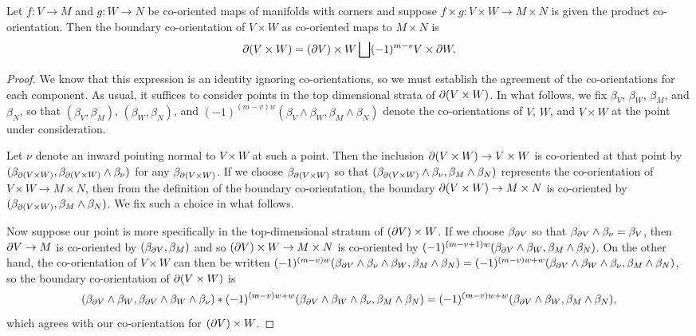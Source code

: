 \begin{proposition}\label{P: boundary of exterior product}
	Let $f \colon V \to M$ and $g \colon W \to N$ be co-oriented maps of manifolds with corners and suppose $f \times g \colon V \times W \to M \times N$ is given the product co-orientation.
	Then the boundary co-orientation of $V \times W$ as co-oriented maps to $M \times N$ is $$\partial(V \times W) = (\partial V) \times W \bigsqcup (-1)^{m-v}V \times \partial W.$$
\end{proposition}

\begin{proof}
	We know that this expression is an identity ignoring co-orientations, so we must establish the agreement of the co-orientations for each component.
	As usual, it suffices to consider points in the top dimensional strata of $\partial(V \times W)$.
	In what follows, we fix $\beta_V$, $\beta_W$, $\beta_M$, and $\beta_N$, so that $(\beta_V,\beta_M)$, $(\beta_W,\beta_N)$, and $(-1)^{(m-v)w}(\beta_V \wedge \beta_W,\beta_M \wedge \beta_N)$ denote the co-orientations of $V$, $W$, and $V \times W$ at the point under consideration.

	Let $\nu$ denote an inward pointing normal to $V \times W$ at such a point.
	Then the inclusion $\partial(V \times W) \to V \times W$ is co-oriented at that point by $(\beta_{\partial(V \times W)},\beta_{\partial(V \times W)} \wedge \beta_\nu)$ for any $\beta_{\partial(V \times W)}$.
	If we choose $\beta_{\partial(V \times W)}$ so that $(\beta_{\partial(V \times W)}\wedge\beta_\nu,\beta_M \wedge \beta_N)$ represents the co-orientation of $V \times W \to M \times N$, then from the definition of the boundary co-orientation, the boundary $\partial(V \times W) \to M \times N$ is co-oriented by $(\beta_{\partial(V \times W)},\beta_M \wedge \beta_N)$.
	We fix such a choice in what follows.

	Now suppose our point is more specifically in the top-dimensional stratum of $(\partial V) \times W$.
	If we choose $\beta_{\partial V}$ so that $\beta_{\partial V} \wedge \beta_\nu = \beta_V$, then $\partial V \to M$ is co-oriented by $(\beta_{\partial V},\beta_M)$ and so $(\partial V) \times W \to M \times N$ is co-oriented by $(-1)^{(m-v+1)w}(\beta_{\partial V} \wedge \beta_W,\beta_M \wedge \beta_N)$.
	On the other hand, the co-orientation of $V \times W$ can then be written $(-1)^{(m-v)w}(\beta_{\partial V} \wedge \beta_\nu \wedge \beta_W,\beta_M \wedge \beta_N) = (-1)^{(m-v)w+w}(\beta_{\partial V} \wedge \beta_W \wedge \beta_\nu,\beta_M \wedge \beta_N)$, so the boundary co-orientation of $\partial(V \times W)$ is $$(\beta_{\partial V} \wedge \beta_W,\beta_{\partial V} \wedge \beta_W \wedge \beta_\nu)*(-1)^{(m-v)w+w}(\beta_{\partial V} \wedge \beta_W \wedge \beta_\nu,\beta_M \wedge \beta_N) = (-1)^{(m-v)w+w}(\beta_{\partial V} \wedge \beta_W,\beta_M \wedge \beta_N),$$
	which agrees with our co-orientation for $(\partial V) \times W$.


\end{proof}
